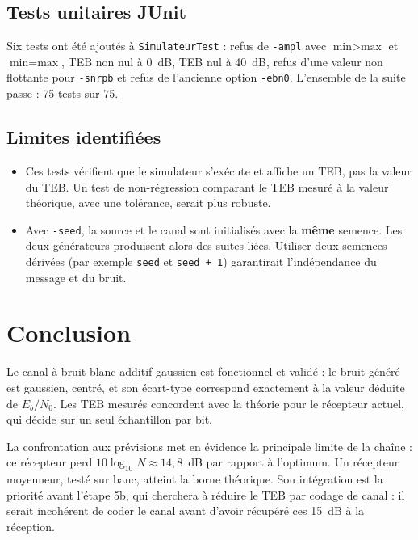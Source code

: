 \documentclass[11pt,a4paper]{article}
\newcommand{\EbNo}{E_b/N_0}
\begin{document}
\subsection{Tests unitaires JUnit}
Six tests ont été ajoutés à \texttt{SimulateurTest} : refus de \texttt{-ampl} avec $\text{min} > \text{max}$ et $\text{min} = \text{max}$, TEB non nul à 0~dB, TEB nul à 40~dB, refus d'une valeur non flottante pour \texttt{-snrpb} et refus de l'ancienne option \texttt{-ebn0}. L'ensemble de la suite passe : 75 tests sur 75.

\subsection{Limites identifiées}
\begin{itemize}
  \item Ces tests vérifient que le simulateur s'exécute et affiche un TEB, pas la valeur du TEB. Un test de non-régression comparant le TEB mesuré à la valeur théorique, avec une tolérance, serait plus robuste.
  \item Avec \texttt{-seed}, la source et le canal sont initialisés avec la \textbf{même} semence. Les deux générateurs produisent alors des suites liées. Utiliser deux semences dérivées (par exemple \texttt{seed} et \texttt{seed + 1}) garantirait l'indépendance du message et du bruit.
\end{itemize}

\section{Conclusion}
Le canal à bruit blanc additif gaussien est fonctionnel et validé : le bruit généré est gaussien, centré, et son écart-type correspond exactement à la valeur déduite de $\EbNo$. Les TEB mesurés concordent avec la théorie pour le récepteur actuel, qui décide sur un seul échantillon par bit.

La confrontation aux prévisions met en évidence la principale limite de la chaîne : ce récepteur perd $10\log_{10}N\approx14{,}8$~dB par rapport à l'optimum. Un récepteur moyenneur, testé sur banc, atteint la borne théorique. Son intégration est la priorité avant l'étape 5b, qui cherchera à réduire le TEB par codage de canal : il serait incohérent de coder le canal avant d'avoir récupéré ces 15~dB à la réception.
\end{document}
